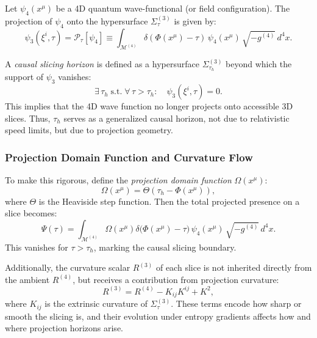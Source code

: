 \documentclass[12pt]{article}
\begin{document}
Let $\psi_4(x^\mu)$ be a 4D quantum wave-functional (or field configuration). The projection of $\psi_4$ onto the hypersurface $\Sigma^{(3)}_\tau$ is given by:
\begin{equation}
\label{eq:projection_operator}
\psi_3(\xi^i, \tau) = \mathcal{P}_\tau[\psi_4] \equiv \int_{\mathcal{M}^{(4)}} \delta(\Phi(x^\mu) - \tau)\, \psi_4(x^\mu)\, \sqrt{-g^{(4)}}\, d^4x.
\end{equation}

A \emph{causal slicing horizon} is defined as a hypersurface $\Sigma^{(3)}_{\tau_h}$ beyond which the support of $\psi_3$ vanishes:
\begin{equation}
\label{eq:horizon_condition}
\exists \, \tau_h \;\text{s.t.}\; \forall \, \tau > \tau_h: \quad \psi_3(\xi^i, \tau) = 0.
\end{equation}
This implies that the 4D wave function no longer projects onto accessible 3D slices. Thus, $\tau_h$ serves as a generalized causal horizon, not due to relativistic speed limits, but due to projection geometry.

\subsubsection*{Projection Domain Function and Curvature Flow}

To make this rigorous, define the \emph{projection domain function} $\Omega(x^\mu)$:
\begin{equation}
\label{eq:projection_domain_function}
\Omega(x^\mu) = \Theta\left( \tau_h - \Phi(x^\mu) \right),
\end{equation}
where $\Theta$ is the Heaviside step function. Then the total projected presence on a slice becomes:
\begin{equation}
\label{eq:projected_presence}
\Psi(\tau) = \int_{\mathcal{M}^{(4)}} \Omega(x^\mu) \delta\big(\Phi(x^\mu) - \tau\big)\, \psi_4(x^\mu)\, \sqrt{-g^{(4)}}\, d^4x.
\end{equation}
This vanishes for $\tau > \tau_h$, marking the causal slicing boundary.

Additionally, the curvature scalar $R^{(3)}$ of each slice is not inherited directly from the ambient $R^{(4)}$, but receives a contribution from projection curvature:
\begin{equation}
\label{eq:projection_curvature}
R^{(3)} = R^{(4)} - K_{ij} K^{ij} + K^2,
\end{equation}
where $K_{ij}$ is the extrinsic curvature of $\Sigma^{(3)}_\tau$. These terms encode how sharp or smooth the slicing is, and their evolution under entropy gradients affects how and where projection horizons arise.
\end{document}
